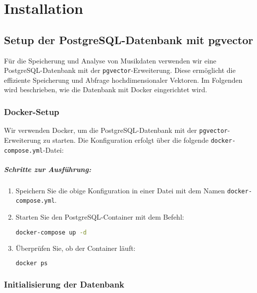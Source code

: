 \chapter{Installation}

\section{Setup der PostgreSQL-Datenbank mit pgvector}

Für die Speicherung und Analyse von Musikdaten verwenden wir eine PostgreSQL-Datenbank mit der \texttt{pgvector}-Erweiterung. Diese ermöglicht die effiziente Speicherung und Abfrage hochdimensionaler Vektoren. Im Folgenden wird beschrieben, wie die Datenbank mit Docker eingerichtet wird.

\subsection{Docker-Setup}

Wir verwenden Docker, um die PostgreSQL-Datenbank mit der \texttt{pgvector}-Erweiterung zu starten. Die Konfiguration erfolgt über die folgende \texttt{docker-compose.yml}-Datei:




\paragraph{Schritte zur Ausführung:}
\begin{enumerate}
    \item Speichern Sie die obige Konfiguration in einer Datei mit dem Namen \texttt{docker-compose.yml}.
    \item Starten Sie den PostgreSQL-Container mit dem Befehl:
    \begin{lstlisting}[language=bash]
    docker-compose up -d
    \end{lstlisting}
    \item Überprüfen Sie, ob der Container läuft:
    \begin{lstlisting}[language=bash]
    docker ps
    \end{lstlisting}
\end{enumerate}

\subsection{Initialisierung der Datenbank}

